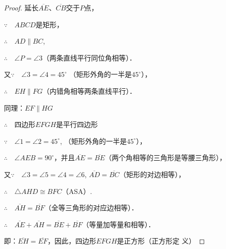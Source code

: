 \begin{proof}
延长$\overline{AE}$、$\overline{CB}$交于$P$点，

$\because\quad ABCD$是矩形，

$\therefore\quad AD\parallel BC$,

$\therefore\quad \angle P=\angle 3$（两条直线平行同位角相等）．

又$\because\quad \angle 3=\angle 4=45^{\circ}$ （矩形外角的一半是$45^{\circ}$），

$\therefore\quad EH\parallel FG$（内错角相等两条直线平行）．

同理：$EF\parallel HG$

$\therefore\quad $四边形$EFGH$是平行四边形

$\because\quad \angle 1=\angle 2=45^{\circ}$, （矩形外角的一半是$45^{\circ}$），

$\therefore\quad \angle AEB=90^{\circ}$，并且$\overline{AE}=\overline{BE}$（两个角相等的三角形是等腰三角形），

又$\because\quad \angle 3=\angle 5=\angle 4=\angle 6$, $\overline{AD}=\overline{BC}$（矩形的对边相等），

$\therefore\quad \triangle AHD\cong BFC$（ASA）.

$\therefore\quad \overline{AH}=\overline{BF}$（全等三角形的对应边相等）．

$\therefore\quad \overline{AE}+\overline{AH}=\overline{BE}+\overline{BF}$（等量加等量和相等）．    

即：$\overline{EH}=\overline{EF}$，因此，四边形$EFGH$是正方形（正方形定
义）
\end{proof}


